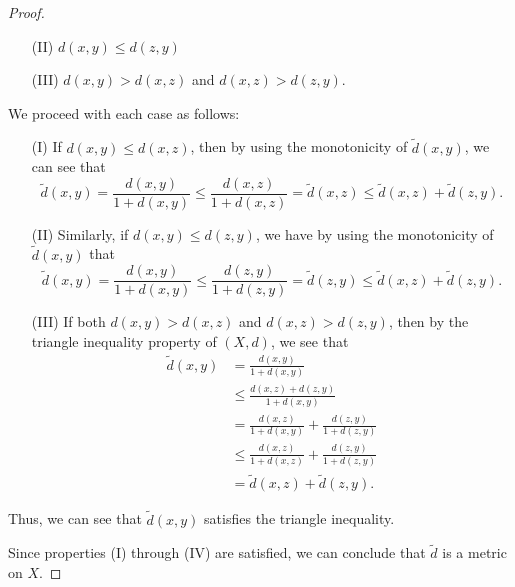 \documentclass[a4paper]{article}
\begin{document}
\begin{proof}
\begin{enumerate}
\begin{enumerate}
\begin{enumerate}
                \item[(II)] \( d(x,y) \leq d(z,y) \)
                \item[(III)] \( d(x,y) > d(x,z) \) and \( d(x,z) > d(z,y) \).
            \end{enumerate}
            We proceed with each case as follows:
            \end{enumerate}
            \begin{enumerate}
                \item[(I)] If \( d(x,y) \leq d(x,z) \), then by using the monotonicity of \( \tilde{d}(x,y) \), we can see that 
                    \[  \tilde{d}(x,y) = \frac{ d(x,y) }{ 1 + d(x,y) } \leq \frac{ d(x,z) }{ 1 + d(x,z) } = \tilde{d}(x,z) \leq \tilde{d}(x,z) + \tilde{d}(z,y). \]
                \item[(II)] Similarly, if \( d(x,y) \leq d(z,y) \), we have by using the monotonicity of \( \tilde{d}(x,y) \) that
                    \[  \tilde{d}(x,y) = \frac{ d(x,y) }{  1 + d(x,y) } \leq \frac{ d(z,y) }{ 1 + d(z,y) } = \tilde{d}(z,y) \leq \tilde{d}(x,z) + \tilde{d}(z,y). \]
                \item[(III)] If both \( d(x,y) > d(x,z) \) and \( d(x,z) > d(z,y) \), then by the triangle inequality property of \( (X,d) \), we see that                   
                    \begin{align*}
                        \tilde{d}(x,y) &= \frac{ d(x,y) }{ 1 + d(x,y) }  \\
                           &\leq \frac{ d(x,z) + d(z,y)  }{ 1 + d(x,y) } \\
                           &= \frac{ d(x,z) }{ 1 + d(x,y)  }  + \frac{ d(z,y) }{ 1 + d(z,y) } \\
                           &\leq \frac{ d(x,z) }{ 1 + d(x,z) }  + \frac{ d(z,y) }{ 1 + d(z,y) } \\
                           &= \tilde{d}(x,z) + \tilde{d}(z,y).
                \end{align*} 
            \end{enumerate}
            Thus, we can see that \( \tilde{d}(x,y) \) satisfies the triangle inequality.
\end{enumerate}
Since properties (I) through (IV) are satisfied, we can conclude that \( \tilde{d} \) is a metric on \( X  \).
\end{proof}
\end{document}
